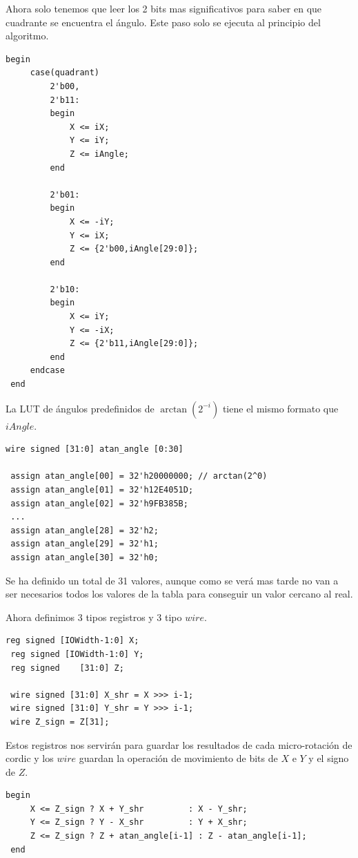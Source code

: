 Ahora solo tenemos que leer los 2 bits mas significativos para saber en que cuadrante se encuentra el ángulo. Este paso solo se ejecuta al principio del algoritmo.
\begin{lstlisting}[caption={Pre-rotación de iAngle pasado por el usuario.}]
 begin
     case(quadrant)
         2'b00,
         2'b11: 
         begin
             X <= iX;
             Y <= iY;
             Z <= iAngle;
         end

         2'b01:
         begin
             X <= -iY;
             Y <= iX;
             Z <= {2'b00,iAngle[29:0]};
         end

         2'b10:
         begin
             X <= iY;
             Y <= -iX;
             Z <= {2'b11,iAngle[29:0]};
         end
     endcase
 end

\end{lstlisting}
La LUT de ángulos predefinidos de $\arctan(2^{-i})$ tiene el mismo formato que $iAngle$.
\begin{lstlisting}[caption={Tabla de $\arctan$.}]
wire signed [31:0] atan_angle [0:30]

 assign atan_angle[00] = 32'h20000000; // arctan(2^0)
 assign atan_angle[01] = 32'h12E4051D; 
 assign atan_angle[02] = 32'h9FB385B; 
 ...
 assign atan_angle[28] = 32'h2;
 assign atan_angle[29] = 32'h1;
 assign atan_angle[30] = 32'h0;
\end{lstlisting}

Se ha definido un total de 31 valores, aunque como se verá mas tarde no van a ser necesarios todos los valores de la tabla para conseguir un valor cercano al real.

Ahora definimos 3 tipos registros y 3 tipo $wire$.

\begin{lstlisting}[caption={Registros y $wire$ para operar con \gls{cordic}}]
 reg signed [IOWidth-1:0] X;
 reg signed [IOWidth-1:0] Y;
 reg signed    [31:0] Z; 
 
 wire signed [31:0] X_shr = X >>> i-1;
 wire signed [31:0] Y_shr = Y >>> i-1;
 wire Z_sign = Z[31];  
\end{lstlisting}

Estos registros nos servirán para guardar los resultados de cada micro-rotación de \gls{cordic} y los $wire$ guardan la operación de movimiento de bits de $X$ e $Y$ y el signo de $Z$.

\begin{lstlisting}[caption={Bucle principal de \gls{cordic}}]
 begin
     X <= Z_sign ? X + Y_shr         : X - Y_shr;
     Y <= Z_sign ? Y - X_shr         : Y + X_shr;
     Z <= Z_sign ? Z + atan_angle[i-1] : Z - atan_angle[i-1];
 end
\end{lstlisting}

